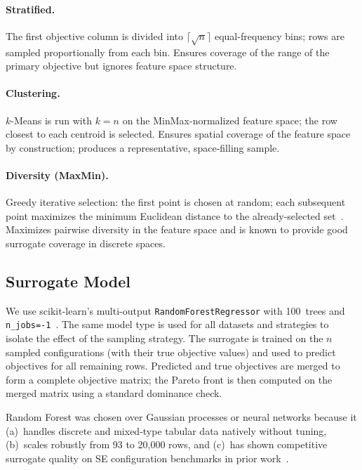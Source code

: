 \documentclass[sigconf,nonacm]{acmart}
\begin{document}
\paragraph{Stratified.}
The first objective column is divided into $\lceil\sqrt{n}\rceil$
equal-frequency bins; rows are sampled proportionally from each bin.
Ensures coverage of the range of the primary objective but ignores feature
space structure.

\paragraph{Clustering.}
$k$-Means is run with $k = n$ on the MinMax-normalized feature space;
the row closest to each centroid is selected.
Ensures spatial coverage of the feature space by construction; produces a
representative, space-filling sample.

\paragraph{Diversity (MaxMin).}
Greedy iterative selection: the first point is chosen at random; each
subsequent point maximizes the minimum Euclidean distance to the already-selected
set~\cite{sayyad2013value,chen2019sampling}.
Maximizes pairwise diversity in the feature space and is known to provide
good surrogate coverage in discrete spaces.

\subsection{Surrogate Model}

We use scikit-learn's multi-output \texttt{RandomForestRegressor}
with 100~trees and \texttt{n\_jobs=-1}~\cite{pedregosa2011scikit}.
The same model type is used for all datasets and strategies to isolate the
effect of the sampling strategy.
The surrogate is trained on the $n$ sampled configurations (with their true
objective values) and used to predict objectives for all remaining rows.
Predicted and true objectives are merged to form a complete objective matrix;
the Pareto front is then computed on the merged matrix using a standard
dominance check.

Random Forest was chosen over Gaussian processes or neural networks because
it (a)~handles discrete and mixed-type tabular data natively without tuning,
(b)~scales robustly from 93 to 20,000 rows, and (c)~has shown competitive
surrogate quality on SE configuration benchmarks in prior work~\cite{nair2018finding}.
\end{document}
